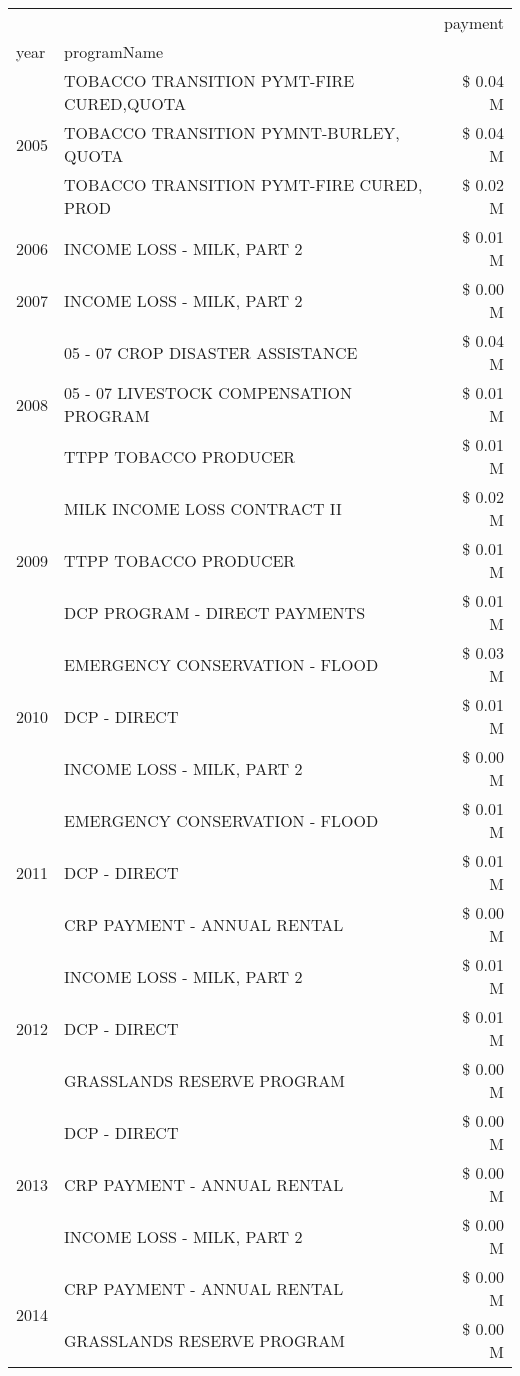 \begin{tabular}{llr}
\toprule
 &  & payment \\
year & programName &  \\
\midrule
\multirow[t]{3}{*}{2005} & TOBACCO TRANSITION PYMT-FIRE CURED,QUOTA & \$ 0.04 M \\
 & TOBACCO TRANSITION PYMNT-BURLEY, QUOTA & \$ 0.04 M \\
 & TOBACCO TRANSITION PYMT-FIRE CURED, PROD & \$ 0.02 M \\
\cline{1-3}
2006 & INCOME LOSS - MILK, PART 2 & \$ 0.01 M \\
\cline{1-3}
2007 & INCOME LOSS - MILK, PART 2 & \$ 0.00 M \\
\cline{1-3}
\multirow[t]{3}{*}{2008} & 05 - 07 CROP DISASTER ASSISTANCE & \$ 0.04 M \\
 & 05 - 07 LIVESTOCK COMPENSATION PROGRAM & \$ 0.01 M \\
 & TTPP TOBACCO PRODUCER & \$ 0.01 M \\
\cline{1-3}
\multirow[t]{3}{*}{2009} & MILK INCOME LOSS CONTRACT II & \$ 0.02 M \\
 & TTPP TOBACCO PRODUCER & \$ 0.01 M \\
 & DCP PROGRAM - DIRECT PAYMENTS & \$ 0.01 M \\
\cline{1-3}
\multirow[t]{3}{*}{2010} & EMERGENCY CONSERVATION - FLOOD & \$ 0.03 M \\
 & DCP - DIRECT & \$ 0.01 M \\
 & INCOME LOSS - MILK, PART 2 & \$ 0.00 M \\
\cline{1-3}
\multirow[t]{3}{*}{2011} & EMERGENCY CONSERVATION - FLOOD & \$ 0.01 M \\
 & DCP - DIRECT & \$ 0.01 M \\
 & CRP PAYMENT - ANNUAL RENTAL & \$ 0.00 M \\
\cline{1-3}
\multirow[t]{3}{*}{2012} & INCOME LOSS - MILK, PART 2 & \$ 0.01 M \\
 & DCP - DIRECT & \$ 0.01 M \\
 & GRASSLANDS RESERVE PROGRAM & \$ 0.00 M \\
\cline{1-3}
\multirow[t]{3}{*}{2013} & DCP - DIRECT & \$ 0.00 M \\
 & CRP PAYMENT - ANNUAL RENTAL & \$ 0.00 M \\
 & INCOME LOSS - MILK, PART 2 & \$ 0.00 M \\
\cline{1-3}
\multirow[t]{2}{*}{2014} & CRP PAYMENT - ANNUAL RENTAL & \$ 0.00 M \\
 & GRASSLANDS RESERVE PROGRAM & \$ 0.00 M \\

\end{tabular}
